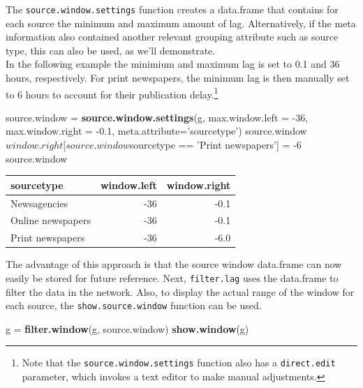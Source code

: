 \documentclass[]{article}
\newenvironment{Shaded}{\begin{snugshade}}{\end{snugshade}}
\newcommand{\KeywordTok}[1]{\textcolor[rgb]{0.13,0.29,0.53}{\textbf{{#1}}}}
\newcommand{\DataTypeTok}[1]{\textcolor[rgb]{0.13,0.29,0.53}{{#1}}}
\newcommand{\DecValTok}[1]{\textcolor[rgb]{0.00,0.00,0.81}{{#1}}}
\newcommand{\FloatTok}[1]{\textcolor[rgb]{0.00,0.00,0.81}{{#1}}}
\newcommand{\StringTok}[1]{\textcolor[rgb]{0.31,0.60,0.02}{{#1}}}
\newcommand{\NormalTok}[1]{{#1}}
\let\rmarkdownfootnote\footnote%
\def\footnote{\protect\rmarkdownfootnote}
\begin{document}
The \texttt{source.window.settings} function creates a data.frame that
contains for each source the minimum and maximum amount of lag.
Alternatively, if the meta information also contained another relevant
grouping attribute such as source type, this can also be used, as we'll
demonstrate.\\In the following example the minimium and maximum lag is
set to 0.1 and 36 hours, respectively. For print newspapers, the minimum
lag is then manually set to 6 hours to account for their publication
delay.\footnote{Note that the \texttt{source.window.settings} function
  also has a \texttt{direct.edit} parameter, which invokes a text editor
  to make manual adjustments.}

\begin{Shaded}
\begin{Highlighting}[]
\NormalTok{source.window =}\StringTok{ }\KeywordTok{source.window.settings}\NormalTok{(g, }\DataTypeTok{max.window.left =} \NormalTok{-}\DecValTok{36}\NormalTok{, }\DataTypeTok{max.window.right =} \NormalTok{-}\FloatTok{0.1}\NormalTok{, }
                                       \DataTypeTok{meta.attribute=}\StringTok{'sourcetype'}\NormalTok{)}
\NormalTok{source.window$window.right[source.window$sourcetype ==}\StringTok{ 'Print newspapers'}\NormalTok{] =}\StringTok{ }\NormalTok{-}\DecValTok{6}
\NormalTok{source.window}
\end{Highlighting}
\end{Shaded}

\begin{longtable}[c]{@{}lrr@{}}
\toprule
sourcetype & window.left & window.right\tabularnewline
\midrule
\endhead
Newsagencies & -36 & -0.1\tabularnewline
Online newspapers & -36 & -0.1\tabularnewline
Print newspapers & -36 & -6.0\tabularnewline
\bottomrule
\end{longtable}

The advantage of this approach is that the source window data.frame can
now easily be stored for future reference. Next, \texttt{filter.lag}
uses the data.frame to filter the data in the network. Also, to display
the actual range of the window for each source, the
\texttt{show.source.window} function can be used.

\begin{Shaded}
\begin{Highlighting}[]
\NormalTok{g =}\StringTok{ }\KeywordTok{filter.window}\NormalTok{(g, source.window)}
\KeywordTok{show.window}\NormalTok{(g)}
\end{Highlighting}
\end{Shaded}
\end{document}
